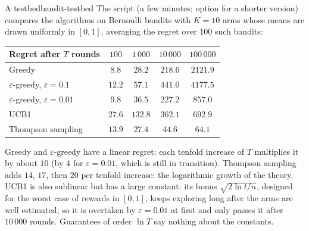 \begin{remark}{A testbed}{bandit-testbed}
  The script  (a few minutes; option
   for a shorter version) compares the algorithms on
  Bernoulli bandits with $K = 10$ arms whose means are drawn uniformly in
  $[0, 1]$, averaging the regret over $100$ such bandits:
  \begin{center}
    \begin{tabular}{@{}lcccc@{}}
      \toprule
      Regret after $T$ rounds & $100$ & $1\,000$ & $10\,000$ &
        $100\,000$ \\
      \midrule
      Greedy & $8.8$ & $28.2$ & $218.6$ & $2121.9$ \\
      $\varepsilon$-greedy, $\varepsilon = 0.1$ & $12.2$ & $57.1$ & $441.0$ &
        $4177.5$ \\
      $\varepsilon$-greedy, $\varepsilon = 0.01$ & $9.8$ & $36.5$ & $227.2$ &
        $857.0$ \\
      UCB1 & $27.6$ & $132.8$ & $362.1$ & $692.9$ \\
      Thompson sampling & $13.9$ & $27.4$ & $44.6$ & $64.1$ \\
      \bottomrule
    \end{tabular}
  \end{center}
  Greedy and $\varepsilon$-greedy have a linear regret: each tenfold
  increase of $T$ multiplies it by about $10$ (by $4$ for $\varepsilon =
  0.01$, which is still in transition). Thompson sampling adds $14$, $17$,
  then $20$ per tenfold increase: the logarithmic growth of the theory. UCB1 is
  also sublinear but has a large constant: its bonus $\sqrt{2 \ln t / n}$,
  designed for the worst case of rewards in $[0, 1]$, keeps exploring
  long after the arms are well estimated, so it is overtaken by
  $\varepsilon = 0.01$ at first and only passes it after $10\,000$ rounds.
  Guarantees of order $\ln T$ say nothing about the constants.


\end{remark}
